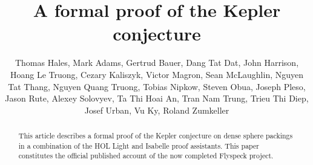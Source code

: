 \documentclass[fmp,times,]{cuparticle}
\theoremstyle{plain}
\theoremstyle{definition}
\theoremstyle{remark}
\begin{document}
\begin{frontmatter}
\title
    {A formal proof of the Kepler conjecture}
\author{Thomas Hales,
  Mark Adams,
  Gertrud Bauer,
  Dang Tat Dat, 
  John Harrison,
  Hoang Le Truong,
  Cezary Kaliszyk,
  Victor Magron, 
  Sean McLaughlin, 
  Nguyen Tat Thang, 
  Nguyen Quang Truong, 
  Tobias Nipkow,
  Steven Obua,
  Joseph Pleso,
  Jason Rute, 
  Alexey Solovyev,
  Ta Thi Hoai An, 
  Tran Nam Trung, 
  Trieu Thi Diep, 
  Josef Urban,
  Vu Ky, %
  Roland Zumkeller
  }
  
  
 

\begin{abstract}
  This article describes a formal proof of the Kepler conjecture on
  dense sphere packings in a combination of the HOL Light and Isabelle
  proof assistants.  This paper constitutes the official published
  account of the now completed Flyspeck project.
\end{abstract}


\maketitle


    \end{frontmatter}

      
      
      

\end{document}

